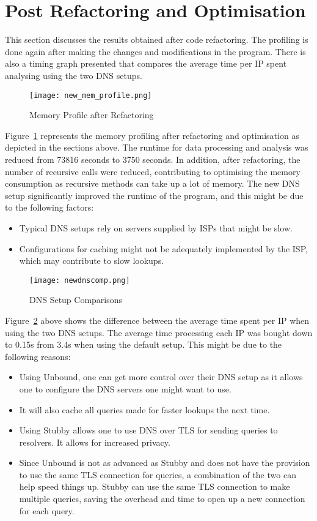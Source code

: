 \section{Post Refactoring and Optimisation}
This section discusses the results obtained after code refactoring. The profiling is done again after 
making the changes and modifications in the program. There is also a timing graph presented 
that compares the average time per IP spent analysing using the two DNS setups.
\begin{figure}[!h]
    \centering
    \texttt{[image: new\_mem\_profile.png]}
    \caption{Memory Profile after Refactoring}
    \label{fig:memprofileafter}
\end{figure}

\noindent Figure~\ref*{fig:memprofileafter} represents the memory profiling after refactoring and optimisation as depicted in the sections above. 
The runtime for data processing and analysis was reduced from 73816 seconds to 3750 seconds. In addition, after refactoring, the number of recursive calls 
were reduced, contributing to optimising the memory consumption as recursive methods can take up a lot of memory. The new DNS setup 
significantly improved the runtime of the program, and this might be due to the following factors:
\begin{itemize}
    \item Typical DNS setups rely on servers supplied by ISPs that might be slow. 
    \item Configurations for caching might not be adequately implemented by the ISP, which may contribute to slow lookups.~\cite{HowandWh90:online}
\end{itemize}
\pagebreak

\begin{figure}[h!]
    \centering
    \texttt{[image: newdnscomp.png]}
    \caption{DNS Setup Comparisons}
    \label{fig:dnscomps}
\end{figure}

\noindent Figure~\ref*{fig:dnscomps} above shows the difference between the average time spent per IP when using the two DNS setups.
The average time processing each IP was bought down to 0.15s from 3.4s when using the default setup. This might be due to the following 
reasons:

\begin{itemize}
    \item Using Unbound, one can get more control over their DNS setup as it allows one to configure the DNS servers one might want to use. 
    \item It will also cache all queries made for faster lookups the next time. 
    \item Using Stubby allows one to use DNS over TLS for sending queries to resolvers. It allows for increased privacy. 
    \item Since Unbound is not as advanced as Stubby and does not have the provision to use the same TLS connection for queries, a combination
    of the two can help speed things up. Stubby can use the same TLS connection to make multiple queries, saving the overhead and time to open up 
    a new connection for each query.~\cite{NLnetLab67:online, DNSPriva7:online}
\end{itemize}
